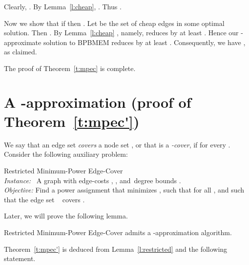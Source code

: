 \documentclass{llncs}
\begin{document}
\vspace{0.2cm}

Clearly, . By Lemma~\ref{l:cheap}, .
Thus .

Now we show that if  then .
Let  be the set of cheap edges in some optimal solution. 
Then . 
By Lemma~\ref{l:cheap} , namely, 
 reduces  by at least .
Hence our -approximate solution  to {\sf BPBMEM}
reduces  by at least .
Consequently, we have 
, 
as claimed.

The proof of Theorem~\ref{t:mpec} is complete.

\section{A -approximation (proof of Theorem~\ref{t:mpec'})}

We say that an edge set  {\em covers} a node set , 
or that  is a {\em -cover}, if  for every . 
Consider the following auxiliary problem:

\vspace{0.2cm}

\noindent
{\sf Restricted Minimum-Power Edge-Cover}  \\
{\em Instance:} \ 
A graph  with edge-costs , , and~degree 
\hphantom{\em Instance: } 
bounds . \\
{\em Objective:} 
Find a power assignment  that minimizes ,
\hphantom{\em Objective:}
such that  for all , and such that the edge set 
\hphantom{\em Objective:}~ covers .

\vspace{0.2cm}

Later, we will prove the following lemma.

\begin{lemma} \label{l:restricted}
{\sf Restricted Minimum-Power Edge-Cover} admits a -approximation algorithm.
\end{lemma}

Theorem~\ref{t:mpec'} is deduced from Lemma~\ref{l:restricted} and the following statement. 
\end{document}
